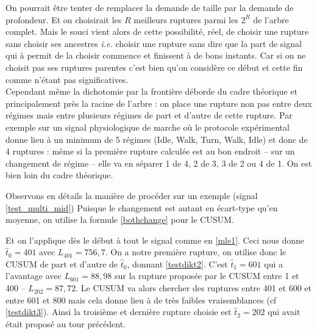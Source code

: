\documentclass[french,11pt,notitlepage]{report}
\begin{document}
	On pourrait être tenter de remplacer la demande de taille par la demande de profondeur.
	Et on choisirait les $R$ meilleurs ruptures parmi les $2^R$ de l'arbre complet.
	Mais le souci vient alors de cette possibilité, réel, de choisir une rupture sans choisir ses ancestres \emph{i.e.}
	choisir une rupture sans dire que la part de signal qui à permit de la choisir commence et finissent à de bons instants.
	Car si on ne choisit pas ses ruptures parentes c'est bien qu'on considère ce début et cette fin comme n'étant pas significatives.
	\\
	
	Cependant même la dichotomie par la frontière déborde du cadre théorique et principalement près la racine de l'arbre :
	on place une rupture non pas entre deux régimes mais entre plusieurs régimes de part et d'autre de cette rupture.
	Par exemple sur un signal physiologique de marche où le protocole expérimental donne lieu à un minimum de 5 régimes (Idle, Walk, Turn, Walk, Idle) et donc de 4 ruptures :
	même si la première rupture calculée est au bon endroit -- sur un changement de régime --
	elle va en séparer 1 de 4, 2 de 3, 3 de 2 ou 4 de 1.
	On est bien loin du cadre théorique.
	
		Observons en détails la manière de procéder sur un exemple (signal \ref{test_multi_mid})
	Puisque le changement est autant en écart-type qu'en moyenne, on utilise la formule \ref{bothchange} pour le CUSUM.
	
	Et on l'applique dès le début à tout le signal comme en \ref{mle1}.
	Ceci nous donne $\hat t_0=401$ avec $L_{401}=756,7$.
	On a notre première rupture, on utilise donc le CUSUM de part et d'autre de $\hat t_0$, donnant \ref{testdikt2}.
	C'est $\hat t_1=601$ qui a l'avantage avec $L_{601}=88,98$ sur la rupture proposée par le CUSUM entre 1 et 400 -- $L_{202}=87,72$.
	Le CUSUM va alors chercher des ruptures entre 401 et 600 et entre 601 et 800 mais cela donne lieu à de très faibles vraisemblances (cf \ref{testdikt3}).
	Ainsi la troisième et dernière rupture choisie est $\hat t_2=202$ qui avait était proposé au tour précédent.
	
\end{document}
